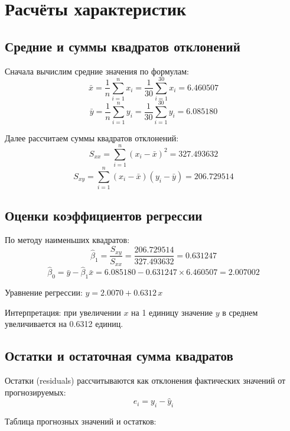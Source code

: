 \documentclass[12pt,a4paper]{article}
\begin{document}
\section{Расчёты характеристик}

\subsection{Средние и суммы квадратов отклонений}

Сначала вычислим средние значения по формулам:
\[
\bar{x} = \frac{1}{n} \sum_{i=1}^{n} x_i = \frac{1}{30} \sum_{i=1}^{30} x_i = 6.460507
\]
\[
\bar{y} = \frac{1}{n} \sum_{i=1}^{n} y_i = \frac{1}{30} \sum_{i=1}^{30} y_i = 6.085180
\]

Далее рассчитаем суммы квадратов отклонений:
\[
S_{xx} = \sum_{i=1}^{n} (x_i - \bar{x})^2 = 327.493632
\]
\[
S_{xy} = \sum_{i=1}^{n} (x_i - \bar{x})(y_i - \bar{y}) = 206.729514
\]

\subsection{Оценки коэффициентов регрессии}

По методу наименьших квадратов:
\[
\hat{\beta}_1 = \frac{S_{xy}}{S_{xx}} = \frac{206.729514}{327.493632} = 0.631247
\]
\[
\hat{\beta}_0 = \bar{y} - \hat{\beta}_1 \bar{x} = 6.085180 - 0.631247 \times 6.460507 = 2.007002
\]

Уравнение регрессии: $\hat{y} = 2.0070 + 0.6312\,x$

Интерпретация: при увеличении $x$ на 1 единицу значение $y$ в среднем увеличивается на 0.6312 единиц.

\subsection{Остатки и остаточная сумма квадратов}

Остатки (residuals) рассчитываются как отклонения фактических значений от прогнозируемых:
\[
e_i = y_i - \hat{y}_i
\]

Таблица прогнозных значений и остатков:
\end{document}
